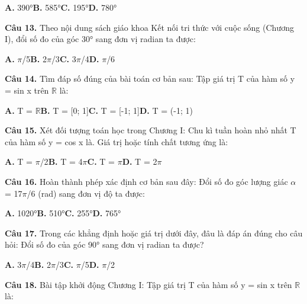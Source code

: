 \documentclass[11pt,a4paper]{article}
\begin{document}
\hspace*{1.5em}\textbf{A.} 390°\quad\quad \textbf{B.} 585°\quad\quad \textbf{C.} 195°\quad\quad \textbf{D.} 780°\par\vspace{2pt}
\textbf{\color{primary} Câu 13.} Theo nội dung sách giáo khoa Kết nối tri thức với cuộc sống (Chương I), đổi số đo của góc 30° sang đơn vị radian ta được:\par
\hspace*{1.5em}\textbf{A.} $\pi$/5\quad\quad \textbf{B.} 2$\pi$/3\quad\quad \textbf{C.} 3$\pi$/4\quad\quad \textbf{D.} $\pi$/6\par\vspace{2pt}
\textbf{\color{primary} Câu 14.} Tìm đáp số đúng của bài toán cơ bản sau: Tập giá trị T của hàm số y = sin x trên $\mathbb{R}$ là:\par
\hspace*{1.5em}\textbf{A.} T = $\mathbb{R}$\quad\quad \textbf{B.} T = [0; 1]\quad\quad \textbf{C.} T = [-1; 1]\quad\quad \textbf{D.} T = (-1; 1)\par\vspace{2pt}
\textbf{\color{primary} Câu 15.} Xét đối tượng toán học trong Chương I: Chu kì tuần hoàn nhỏ nhất T của hàm số y = cos x là. Giá trị hoặc tính chất tương ứng là:\par
\hspace*{1.5em}\textbf{A.} T = $\pi$/2\quad\quad \textbf{B.} T = 4$\pi$\quad\quad \textbf{C.} T = $\pi$\quad\quad \textbf{D.} T = 2$\pi$\par\vspace{2pt}
\textbf{\color{primary} Câu 16.} Hoàn thành phép xác định cơ bản sau đây: Đổi số đo góc lượng giác $\alpha$ = 17$\pi$/6 (rad) sang đơn vị độ ta được:\par
\hspace*{1.5em}\textbf{A.} 1020°\quad\quad \textbf{B.} 510°\quad\quad \textbf{C.} 255°\quad\quad \textbf{D.} 765°\par\vspace{2pt}
\textbf{\color{primary} Câu 17.} Trong các khẳng định hoặc giá trị dưới đây, đâu là đáp án đúng cho câu hỏi: Đổi số đo của góc 90° sang đơn vị radian ta được?\par
\hspace*{1.5em}\textbf{A.} 3$\pi$/4\quad\quad \textbf{B.} 2$\pi$/3\quad\quad \textbf{C.} $\pi$/5\quad\quad \textbf{D.} $\pi$/2\par\vspace{2pt}
\textbf{\color{primary} Câu 18.} Bài tập khởi động Chương I: Tập giá trị T của hàm số y = sin x trên $\mathbb{R}$ là:\par
\end{document}
